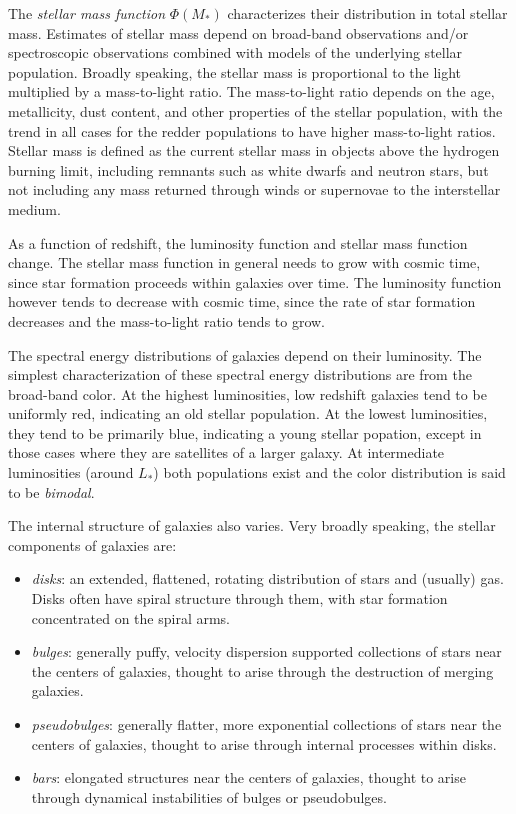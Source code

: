 The {\it stellar mass function} $\Phi(M_\ast)$ characterizes their
distribution in total stellar mass. Estimates of stellar mass depend
on broad-band observations and/or spectroscopic observations combined
with models of the underlying stellar population. Broadly speaking,
the stellar mass is proportional to the light multiplied by a
mass-to-light ratio. The mass-to-light ratio depends on the age,
metallicity, dust content, and other properties of the stellar
population, with the trend in all cases for the redder populations to
have higher mass-to-light ratios. Stellar mass is defined as the
current stellar mass in objects above the hydrogen burning limit,
including remnants such as white dwarfs and neutron stars, but not
including any mass returned through winds or supernovae to the
interstellar medium.

As a function of redshift, the luminosity function and stellar mass
function change. The stellar mass function in general needs to grow
with cosmic time, since star formation proceeds within galaxies over
time. The luminosity function however tends to decrease with cosmic
time, since the rate of star formation decreases and the mass-to-light
ratio tends to grow.

The spectral energy distributions of galaxies depend on their
luminosity. The simplest characterization of these spectral energy
distributions are from the broad-band color. At the highest
luminosities, low redshift galaxies tend to be uniformly red,
indicating an old stellar population. At the lowest luminosities, they
tend to be primarily blue, indicating a young stellar popation, except
in those cases where they are satellites of a larger galaxy. At
intermediate luminosities (around $L_\ast$) both populations exist and
the color distribution is said to be {\it bimodal}.

The internal structure of galaxies also varies. Very broadly speaking,
the stellar components of galaxies are:
\begin{itemize}
 \item {\it disks}: an extended, flattened, rotating distribution of
 stars and (usually) gas. Disks often have spiral structure through
 them, with star formation concentrated on the spiral arms.
 \item {\it bulges}: generally puffy, velocity dispersion supported
  collections of stars near the centers of galaxies, thought to arise
  through the destruction of merging galaxies. 
 \item {\it pseudobulges}: generally flatter, more exponential
   collections of stars near the centers of galaxies, thought to arise
   through internal processes within disks. 
 \item {\it bars}: elongated structures near the centers of galaxies,
   thought to arise through dynamical instabilities of bulges or
   pseudobulges. 
\end{itemize}

